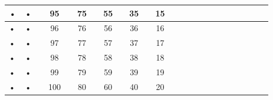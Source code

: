 \documentclass[12pt,a4paper]{article}
\begin{document}
\begin{tabular}{|Oc|Oc|Oc|Oc|Oc|Oc|Oc|Oc|Oc|Oc|Oc|Oc|}
\hline 
• & • &   & 95 &   & 75 &  & 55 &  & 35 &  & 15 \\ 
\hline 
• & • &   & 96 &   & 76 &  & 56 &  & 36 &  & 16 \\ 
\hline 
• & • &   & 97 &   & 77 &  & 57 &  & 37 &  & 17 \\ 
\hline 
• & • &   & 98 &   & 78 &  & 58 &  & 38 &  & 18 \\ 
\hline 
• & • &   & 99 &   & 79 &  & 59 &  & 39 &  & 19 \\ 
\hline 
• & • &   & 100 &   & 80 &  & 60 &  & 40 &  & 20 \\ 
\hline 
\end{tabular}

 
\newpage%
\end{document}
